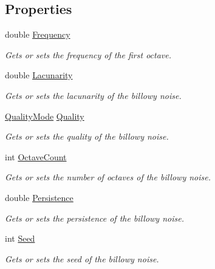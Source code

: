 \subsection*{Properties}
\begin{DoxyCompactItemize}
\item 
double \hyperlink{class_lib_noise_1_1_generator_1_1_billow_a24311ca7147373c34e42e7d7abf10711}{Frequency}
\begin{DoxyCompactList}\small\item\em Gets or sets the frequency of the first octave. \end{DoxyCompactList}\item 
double \hyperlink{class_lib_noise_1_1_generator_1_1_billow_a88f28c2995f6031034fa0ef043db84be}{Lacunarity}
\begin{DoxyCompactList}\small\item\em Gets or sets the lacunarity of the billowy noise. \end{DoxyCompactList}\item 
\hyperlink{namespace_lib_noise_ab253d2180e71b8b4b51e250163ca0e27}{Quality\+Mode} \hyperlink{class_lib_noise_1_1_generator_1_1_billow_a58f61cf43c3ebb220cfcc4598afdd531}{Quality}
\begin{DoxyCompactList}\small\item\em Gets or sets the quality of the billowy noise. \end{DoxyCompactList}\item 
int \hyperlink{class_lib_noise_1_1_generator_1_1_billow_a5fb9dae1d8f3f5d61eddfc05814b7275}{Octave\+Count}
\begin{DoxyCompactList}\small\item\em Gets or sets the number of octaves of the billowy noise. \end{DoxyCompactList}\item 
double \hyperlink{class_lib_noise_1_1_generator_1_1_billow_a120e5be5e5e09324dc323e439e2c3302}{Persistence}
\begin{DoxyCompactList}\small\item\em Gets or sets the persistence of the billowy noise. \end{DoxyCompactList}\item 
int \hyperlink{class_lib_noise_1_1_generator_1_1_billow_a17cb07028e1e9cc7c6ba17e1b025e62e}{Seed}
\begin{DoxyCompactList}\small\item\em Gets or sets the seed of the billowy noise. \end{DoxyCompactList}\end{DoxyCompactItemize}
